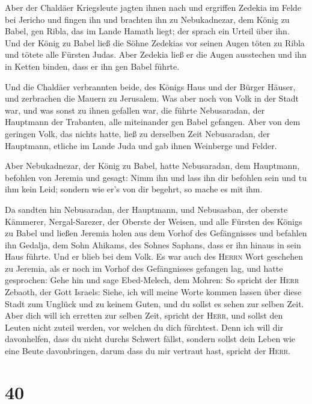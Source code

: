  Aber der Chaldäer Kriegsleute jagten ihnen nach und
ergriffen Zedekia im Felde bei Jericho und fingen ihn und brachten ihn
zu Nebukadnezar, dem König zu Babel, gen Ribla, das im Lande Hamath
liegt; der sprach ein Urteil über ihn.  Und der König zu
Babel ließ die Söhne Zedekias vor seinen Augen töten zu Ribla und tötete
alle Fürsten Judas.  Aber Zedekia ließ er die Augen
ausstechen und ihn in Ketten binden, dass er ihn gen Babel führte.

 Und die Chaldäer verbrannten beide, des Königs Haus und
der Bürger Häuser, und zerbrachen die Mauern zu Jerusalem.
 Was aber noch von Volk in der Stadt war, und was sonst zu
ihnen gefallen war, die führte Nebusaradan, der Hauptmann der Trabanten,
alle miteinander gen Babel gefangen.  Aber von dem
geringen Volk, das nichts hatte, ließ zu derselben Zeit Nebusaradan, der
Hauptmann, etliche im Lande Juda und gab ihnen Weinberge und Felder.

 Aber Nebukadnezar, der König zu Babel, hatte
Nebusaradan, dem Hauptmann, befohlen von Jeremia und gesagt:
 Nimm ihn und lass ihn dir befohlen sein und tu ihm kein
Leid; sondern wie er's von dir begehrt, so mache es mit ihm.

 Da sandten hin Nebusaradan, der Hauptmann, und
Nebusasban, der oberste Kämmerer, Nergal-Sarezer, der Oberste der
Weisen, und alle Fürsten des Königs zu Babel  und ließen
Jeremia holen aus dem Vorhof des Gefängnisses und befahlen ihn Gedalja,
dem Sohn Ahikams, des Sohnes Saphans, dass er ihn hinaus in sein Haus
führte. Und er blieb bei dem Volk.  Es war auch des
\textsc{Herrn} Wort geschehen zu Jeremia, als er noch im Vorhof des
Gefängnisses gefangen lag, und hatte gesprochen:  Gehe
hin und sage Ebed-Melech, dem Mohren: So spricht der \textsc{Herr}
Zebaoth, der Gott Israels: Siehe, ich will meine Worte kommen lassen
über diese Stadt zum Unglück und zu keinem Guten, und du sollst es sehen
zur selben Zeit.  Aber dich will ich erretten zur selben
Zeit, spricht der \textsc{Herr}, und sollst den Leuten nicht zuteil
werden, vor welchen du dich fürchtest.  Denn ich will dir
davonhelfen, dass du nicht durchs Schwert fällst, sondern sollst dein
Leben wie eine Beute davonbringen, darum dass du mir vertraut hast,
spricht der \textsc{Herr}.

\hypertarget{section-39}{%
\section{40}\label{section-39}}

